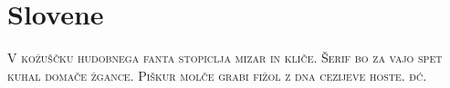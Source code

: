 
\presection\section*{\checkyes Slovene}\postsection

\noindent\textsc{V kožuščku hudobnega fanta stopiclja mizar in kliče.
Šerif bo za vajo spet kuhal domače žgance.
Piškur molče grabi fižol z dna cezijeve hoste. đć.}